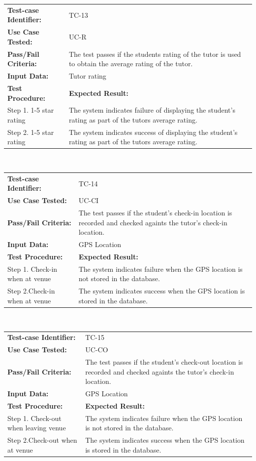\documentclass[12pt]{article}
\begin{document}
\begin{tabular}{| p{8cm} | p{8cm} |} \hline
	\textbf{Test-case Identifier:}& TC-13\\
	\textbf{Use Case Tested:}& UC-R\\
	\textbf{Pass/Fail Criteria:}& The test passes if the students rating of the tutor is used to obtain the average rating of the tutor.\\
	\textbf{Input Data:}& Tutor rating\\\hline
	\textbf{Test Procedure:}& \textbf{Expected Result:} \\\hline
	Step 1. 1-5 star rating & The system indicates failure of displaying the student's rating as part of the tutors average rating. \\
	Step 2. 1-5 star rating & The system indicates success of displaying the student's rating as part of the tutors average rating.\\
		\hline
\end{tabular}
\\

\begin{tabular}{| p{8cm} | p{8cm} |} \hline
	\textbf{Test-case Identifier:}& TC-14\\
	\textbf{Use Case Tested:}& UC-CI\\
	\textbf{Pass/Fail Criteria:}& The test passes if the student's check-in location is recorded and checked againts the tutor's check-in location.\\
	\textbf{Input Data:}& GPS Location\\\hline
	\textbf{Test Procedure:}& \textbf{Expected Result:} \\\hline
	Step 1. Check-in when at venue & The system indicates failure when the GPS location is not stored in the database. \\
	Step 2.Check-in when at venue & The system indicates success when the GPS location is  stored in the database.\\
		\hline
\end{tabular}
\\

\begin{tabular}{| p{8cm} | p{8cm} |} \hline
	\textbf{Test-case Identifier:}& TC-15\\
	\textbf{Use Case Tested:}& UC-CO\\
	\textbf{Pass/Fail Criteria:}& The test passes if the student's check-out location is recorded and checked againts the tutor's check-in location.\\
	\textbf{Input Data:}& GPS Location\\\hline
	\textbf{Test Procedure:}& \textbf{Expected Result:} \\\hline
	Step 1. Check-out when leaving venue & The system indicates failure when the GPS location is not stored in the database. \\
	Step 2.Check-out when at venue & The system indicates success when the GPS location is stored in the database.\\
		\hline
\end{tabular}
\\
\end{document}
